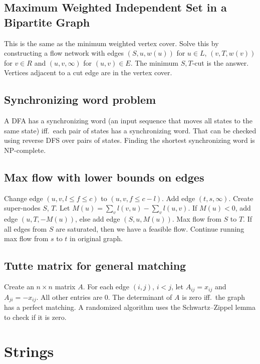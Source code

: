 \documentclass[8pt,a4paper,landscape,oneside]{amsart}
\begin{document}
\begin{multicols*}{3}
    \subsection{Maximum Weighted Independent Set in a Bipartite Graph}
        This is the same as the minimum weighted vertex cover. Solve this by
        constructing a flow network with edges $(S,u,w(u))$ for $u\in L$,
        $(v,T,w(v))$ for $v\in R$ and $(u,v,\infty)$ for $(u,v)\in E$. The
        minimum $S,T$-cut is the answer. Vertices adjacent to a cut edge are
        in the vertex cover.

    \subsection{Synchronizing word problem}
        A DFA has a synchronizing word (an input sequence that moves all states
        to the same state) iff.\ each pair of states has a synchronizing word.
        That can be checked using reverse DFS over pairs of states. Finding the
        shortest synchronizing word is NP-complete.

    \subsection{Max flow with lower bounds on edges}
        Change edge $(u,v,l\leq f\leq c)$ to $(u,v,f\leq c-l)$. Add edge
        $(t,s,\infty)$. Create super-nodes $S$, $T$. Let $M(u) = \sum_{v}
        l(v,u) - \sum_{v} l(u,v)$. If $M(u)<0$, add edge $(u,T,-M(u))$, else
        add edge $(S,u,M(u))$. Max flow from $S$ to $T$. If all edges from $S$
        are saturated, then we have a feasible flow. Continue running max flow
        from $s$ to $t$ in original graph.

    \subsection{Tutte matrix for general matching}
        Create an $n\times n$ matrix $A$. For each edge $(i,j)$, $i<j$, let
        $A_{ij} = x_{ij}$ and $A_{ji} = -x_{ij}$. All other entries are $0$.
        The determinant of $A$ is zero iff.\ the graph has a perfect matching.
        A randomized algorithm uses the Schwartz--Zippel lemma to check if it is
        zero.

\section{Strings}


\end{multicols*}
\end{document}
